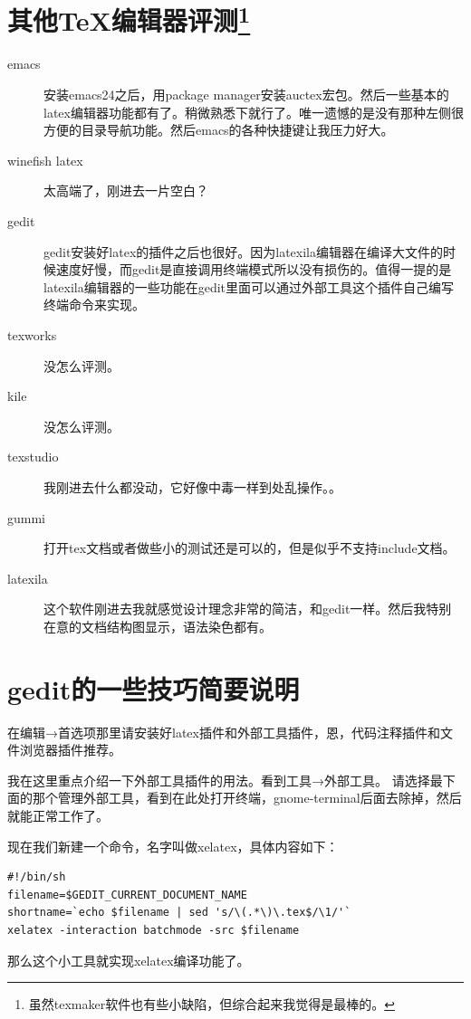\documentclass[11pt,oneside]{book}
\begin{document}
\begin{common-format}
\section[其他\TeX 编辑器评测]{其他\TeX 编辑器评测\footnote{虽然texmaker软件也有些小缺陷，但综合起来我觉得是最棒的。}}
\begin{description}
\item[emacs] 安装emacs24之后，用package manager安装auctex宏包。然后一些基本的latex编辑器功能都有了。稍微熟悉下就行了。唯一遗憾的是没有那种左侧很方便的目录导航功能。然后emacs的各种快捷键让我压力好大。
\item[winefish latex] 太高端了，刚进去一片空白？
\item[gedit] gedit安装好latex的插件之后也很好。因为latexila编辑器在编译大文件的时候速度好慢，而gedit是直接调用终端模式所以没有损伤的。值得一提的是latexila编辑器的一些功能在gedit里面可以通过外部工具这个插件自己编写终端命令来实现。
\item[texworks] 没怎么评测。
\item[kile] 没怎么评测。
\item[texstudio] 我刚进去什么都没动，它好像中毒一样到处乱操作。。
\item[gummi] 打开tex文档或者做些小的测试还是可以的，但是似乎不支持include文档。
\item[latexila] 这个软件刚进去我就感觉设计理念非常的简洁，和gedit一样。然后我特别在意的文档结构图显示，语法染色都有。
\end{description}


\section{gedit的一些技巧简要说明}
在编辑→首选项那里请安装好latex插件和外部工具插件，恩，代码注释插件和文件浏览器插件推荐。

我在这里重点介绍一下外部工具插件的用法。看到工具→外部工具。
请选择最下面的那个管理外部工具，看到在此处打开终端，gnome-terminal后面去除掉，然后就能正常工作了。

现在我们新建一个命令，名字叫做xelatex，具体内容如下：
\begin{Verbatim}
#!/bin/sh
filename=$GEDIT_CURRENT_DOCUMENT_NAME
shortname=`echo $filename | sed 's/\(.*\)\.tex$/\1/'`
xelatex -interaction batchmode -src $filename
\end{Verbatim}
那么这个小工具就实现xelatex编译功能了。


\end{common-format}
\end{document}
